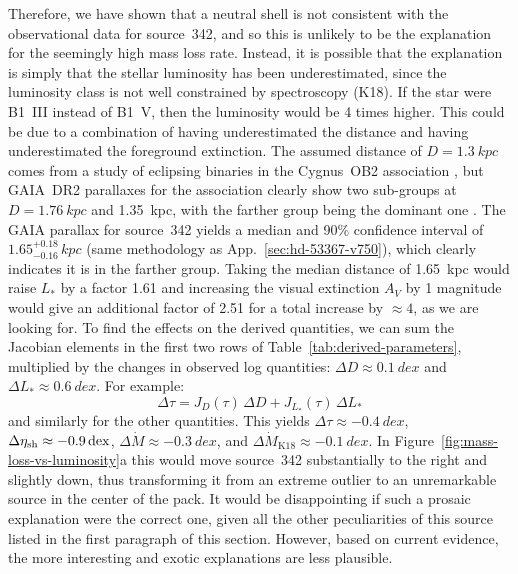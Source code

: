Therefore, we have shown that a neutral shell is not consistent with
the observational data for source~342, and so this is unlikely to be
the explanation for the seemingly high mass loss rate.  Instead, it is
possible that the explanation is simply that the stellar luminosity
has been underestimated, since the luminosity class is not well
constrained by spectroscopy (K18).  If the star were B1~III instead of
B1~V, then the luminosity would be 4 times higher.  This could be due
to a combination of having underestimated the distance and having
underestimated the foreground extinction.  The assumed distance of
\(D= \SI{1.3}{kpc}\) comes from a study of eclipsing binaries in the
Cygnus~OB2 association \citep{Kiminki:2015a}, but GAIA~DR2 parallaxes
for the association clearly show two sub-groups at
\(D = \SI{1.76}{kpc}\) and \SI{1.35}{kpc}, with the farther group
being the dominant one \citep{Berlanas:2019a}.  The GAIA parallax for
source~342 yields a median and 90\% confidence interval of
\(1.65^{+0.18}_{-0.16} \, \si{kpc}\) (same methodology as
App.~\ref{sec:hd-53367-v750}),
which clearly indicates it is in the farther group.  Taking the median
distance of \SI{1.65}{kpc} would raise \(L_*\) by a factor 1.61 and
increasing the visual extinction \(A_V\) by 1 magnitude would give an
additional factor of 2.51 for a total increase by \(\approx 4\), as we
are looking for.  To find the effects on the derived quantities, we
can sum the Jacobian elements in the first two rows of
Table~\ref{tab:derived-parameters}, multiplied by the changes in
observed log quantities: \(\Delta D \approx \SI{+0.1}{dex}\) and
\(\Delta L_* \approx \SI{+0.6}{dex}\). For example:
\begin{equation}
  \label{eq:delta-derived}
  \Delta\tau = J_D(\tau)\, \Delta D + J_{L_*}(\tau)\, \Delta L_*
\end{equation}
and similarly for the other quantities.  This yields
\(\Delta \tau \approx \SI{-0.4}{dex}\),
\(\Delta \eta_{\text{sh}} \approx \SI{-0.9}{dex}\),
\(\Delta \dot{M} \approx \SI{-0.3}{dex}\), and
\(\Delta \dot{M}_{\text{K18}} \approx \SI{-0.1}{dex}\).  In
Figure~\ref{fig:mass-loss-vs-luminosity}a this would move source~342
substantially to the right and slightly down, thus transforming it
from an extreme outlier to an unremarkable source in the center of the
pack.  It would be disappointing if such a prosaic explanation were
the correct one, given all the other peculiarities of this source
listed in the first paragraph of this section.  However, based on
current evidence, the more interesting and exotic explanations are
less plausible.









